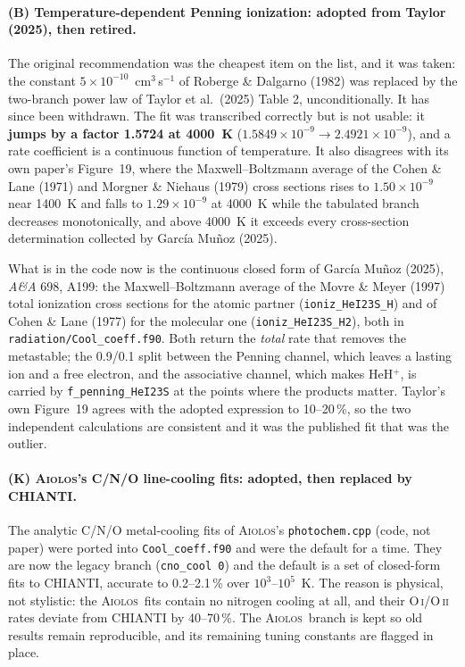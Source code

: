 \documentclass[english,a4paper]{my_memo}
\newcommand{\AIOLOS}{\textsc{Aiolos}}
\begin{document}
\paragraph{(B) Temperature-dependent Penning ionization: adopted from Taylor
(2025), then retired.} The original recommendation was the cheapest item on the
list, and it was taken: the constant $5\times10^{-10}$~cm$^3$\,s$^{-1}$ of
Roberge \& Dalgarno (1982) was replaced by the two-branch power law of Taylor
et al.\ (2025) Table 2, unconditionally. It has since been withdrawn. The fit
was transcribed correctly but is not usable: it \textbf{jumps by a factor
1.5724 at 4000~K} ($1.5849\times10^{-9} \to 2.4921\times10^{-9}$), and a rate
coefficient is a continuous function of temperature. It also disagrees with its
own paper's Figure~19, where the Maxwell--Boltzmann average of the Cohen \&
Lane (1971) and Morgner \& Niehaus (1979) cross sections rises to
$1.50\times10^{-9}$ near 1400~K and falls to $1.29\times10^{-9}$ at 4000~K
while the tabulated branch decreases monotonically, and above 4000~K it exceeds
every cross-section determination collected by Garc\'ia Mu\~noz (2025).

What is in the code now is the continuous closed form of Garc\'ia Mu\~noz
(2025), \emph{A\&A} 698, A199: the Maxwell--Boltzmann average of the Movre \&
Meyer (1997) total ionization cross sections for the atomic partner
(\texttt{ioniz\_HeI23S\_H}) and of Cohen \& Lane (1977) for the molecular one
(\texttt{ioniz\_HeI23S\_H2}), both in \texttt{radiation/Cool\_coeff.f90}.
Both return the \emph{total} rate that removes the metastable; the 0.9/0.1
split between the Penning channel, which leaves a lasting ion and a free
electron, and the associative channel, which makes HeH$^+$, is carried by
\texttt{f\_penning\_HeI23S} at the points where the products matter. Taylor's
own Figure~19 agrees with the adopted expression to 10--20\,\%, so the two
independent calculations are consistent and it was the published fit that was
the outlier.

\paragraph{(K) \AIOLOS's C/N/O line-cooling fits: adopted, then replaced by
CHIANTI.} The analytic C/N/O metal-cooling fits of \AIOLOS's
\texttt{photochem.cpp} (code, not paper) were ported into
\texttt{Cool\_coeff.f90} and were the default for a time. They are now the legacy branch (\texttt{cno\_cool 0}) and
the default is a set of closed-form fits to CHIANTI, accurate to 0.2--2.1\,\%
over $10^3$--$10^5$~K. The reason is physical, not stylistic: the \AIOLOS\
fits contain no nitrogen cooling at all, and their O\,\textsc{i}/O\,\textsc{ii}
rates deviate from CHIANTI by 40--70\,\%. The \AIOLOS\ branch is kept so old
results remain reproducible, and its remaining tuning constants are flagged in
place.
\end{document}
